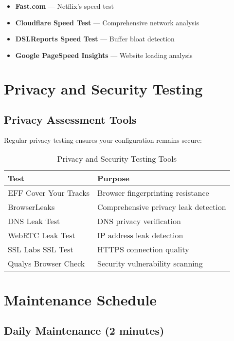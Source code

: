 \documentclass[11pt,a4paper,oneside]{book}
\begin{document}
\begin{itemize}
    \item \textbf{Fast.com} — Netflix's speed test
    \item \textbf{Cloudflare Speed Test} — Comprehensive network analysis
    \item \textbf{DSLReports Speed Test} — Buffer bloat detection
    \item \textbf{Google PageSpeed Insights} — Website loading analysis
\end{itemize}

\section{Privacy and Security Testing}

\subsection{Privacy Assessment Tools}

Regular privacy testing ensures your configuration remains secure:

\begin{table}[h]
\centering
\begin{tabular}{@{}ll@{}}
\toprule
\textbf{Test} & \textbf{Purpose} \\
\midrule
EFF Cover Your Tracks & Browser fingerprinting resistance \\
BrowserLeaks & Comprehensive privacy leak detection \\
DNS Leak Test & DNS privacy verification \\
WebRTC Leak Test & IP address leak detection \\
SSL Labs SSL Test & HTTPS connection quality \\
Qualys Browser Check & Security vulnerability scanning \\
\bottomrule
\end{tabular}
\caption{Privacy and Security Testing Tools}
\end{table}

\section{Maintenance Schedule}

\subsection{Daily Maintenance (2 minutes)}
\end{document}
